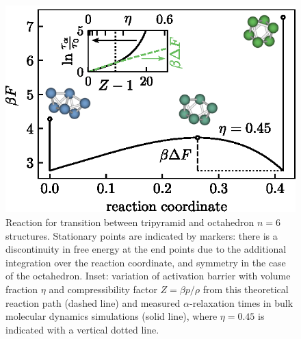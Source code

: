\documentclass[11pt,twoside]{report}
\begin{document}
\begin{figure}
  \includegraphics[width=0.9\linewidth,outer]{n6-reaction-path}
  \caption[The simplest nontrivial reaction path in hard spheres: octahedron to tripyramid]{
    Reaction for transition between tripyramid and octahedron $n = 6$ structures.
    Stationary points are indicated by markers: there is a discontinuity in free energy at the end points due to the additional integration over the reaction coordinate, and symmetry in the case of the octahedron.
    Inset: variation of activation barrier with volume fraction $\eta$ and compressibility factor $Z = \beta p/\rho$ from this theoretical reaction path (dashed line) and measured $\alpha$-relaxation times in bulk molecular dynamics simulations (solid line), where $\eta = 0.45$ is indicated with a vertical dotted line.
  }
  \label{fig:reaction-path-6}
\end{figure}
\end{document}
